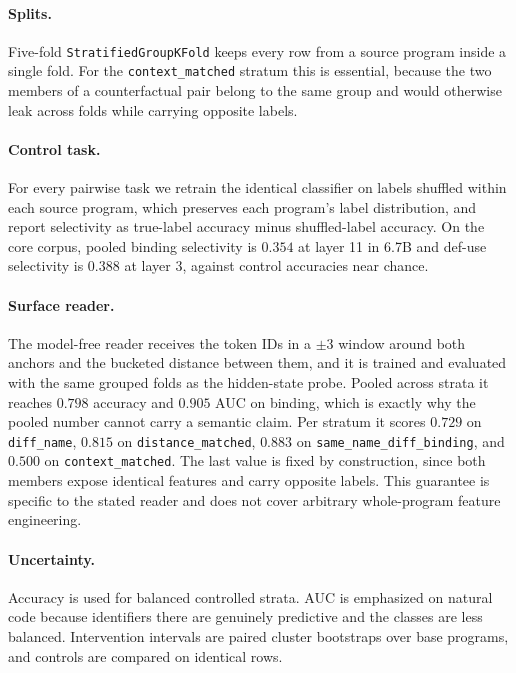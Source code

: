 \documentclass{article}
\begin{document}
\paragraph{Splits.}
Five-fold \texttt{StratifiedGroupKFold} keeps every row from a source program inside a single fold. For the \texttt{context\_matched} stratum this is essential, because the two members of a counterfactual pair belong to the same group and would otherwise leak across folds while carrying opposite labels.

\paragraph{Control task.}
For every pairwise task we retrain the identical classifier on labels shuffled within each source program, which preserves each program's label distribution, and report selectivity as true-label accuracy minus shuffled-label accuracy. On the core corpus, pooled binding selectivity is $0.354$ at layer 11 in 6.7B and def-use selectivity is $0.388$ at layer 3, against control accuracies near chance.

\paragraph{Surface reader.}
The model-free reader receives the token IDs in a $\pm3$ window around both anchors and the bucketed distance between them, and it is trained and evaluated with the same grouped folds as the hidden-state probe. Pooled across strata it reaches $0.798$ accuracy and $0.905$ AUC on binding, which is exactly why the pooled number cannot carry a semantic claim. Per stratum it scores $0.729$ on \texttt{diff\_name}, $0.815$ on \texttt{distance\_matched}, $0.883$ on \texttt{same\_name\_diff\_binding}, and $0.500$ on \texttt{context\_matched}. The last value is fixed by construction, since both members expose identical features and carry opposite labels. This guarantee is specific to the stated reader and does not cover arbitrary whole-program feature engineering.

\paragraph{Uncertainty.}
Accuracy is used for balanced controlled strata. AUC is emphasized on natural code because identifiers there are genuinely predictive and the classes are less balanced. Intervention intervals are paired cluster bootstraps over base programs, and controls are compared on identical rows.
\end{document}
